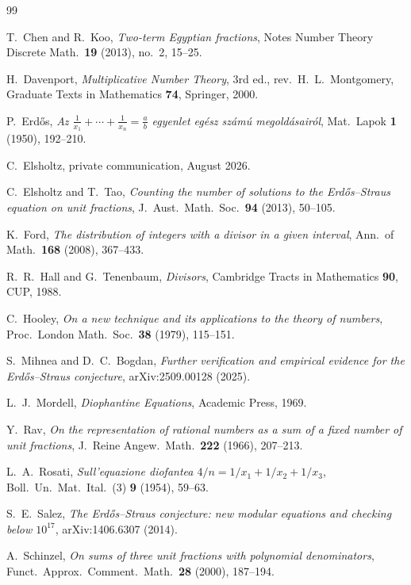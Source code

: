 \documentclass[11pt]{article}
\theoremstyle{definition}
\theoremstyle{remark}
\begin{document}
\begin{thebibliography}{99}

 T.~Chen and R.~Koo,
\emph{Two-term Egyptian fractions}, Notes Number Theory Discrete Math.\ \textbf{19}
(2013), no.~2, 15--25.

 H.~Davenport,
\emph{Multiplicative Number Theory}, 3rd ed., rev.\ H.~L.~Montgomery,
Graduate Texts in Mathematics \textbf{74}, Springer, 2000.

 P.~Erd\H{o}s,
\emph{Az $\frac{1}{x_1} + \cdots + \frac{1}{x_n} = \frac{a}{b}$ egyenlet eg\'esz
sz\'am\'u megold\'asair\'ol}, Mat.\ Lapok \textbf{1} (1950), 192--210.

 C.~Elsholtz, private communication, August 2026.

 C.~Elsholtz and T.~Tao,
\emph{Counting the number of solutions to the Erd\H{o}s--Straus equation on unit
fractions}, J.~Aust.\ Math.\ Soc.\ \textbf{94} (2013), 50--105.

 K.~Ford,
\emph{The distribution of integers with a divisor in a given interval},
Ann.\ of Math.\ \textbf{168} (2008), 367--433.

 R.~R.~Hall and G.~Tenenbaum,
\emph{Divisors}, Cambridge Tracts in Mathematics \textbf{90}, CUP, 1988.

 C.~Hooley,
\emph{On a new technique and its applications to the theory of numbers},
Proc.\ London Math.\ Soc.\ \textbf{38} (1979), 115--151.

 S.~Mihnea and D.~C.~Bogdan,
\emph{Further verification and empirical evidence for the Erd\H{o}s--Straus
conjecture}, arXiv:2509.00128 (2025).

 L.~J.~Mordell,
\emph{Diophantine Equations}, Academic Press, 1969.

 Y.~Rav,
\emph{On the representation of rational numbers as a sum of a fixed number of unit
fractions}, J.~Reine Angew.\ Math.\ \textbf{222} (1966), 207--213.

 L.~A.~Rosati,
\emph{Sull'equazione diofantea $4/n = 1/x_1 + 1/x_2 + 1/x_3$},
Boll.\ Un.\ Mat.\ Ital.\ (3) \textbf{9} (1954), 59--63.

 S.~E.~Salez,
\emph{The Erd\H{o}s--Straus conjecture: new modular equations and checking below
$10^{17}$}, arXiv:1406.6307 (2014).

 A.~Schinzel,
\emph{On sums of three unit fractions with polynomial denominators},
Funct.\ Approx.\ Comment.\ Math.\ \textbf{28} (2000), 187--194.


\end{thebibliography}
\end{document}
